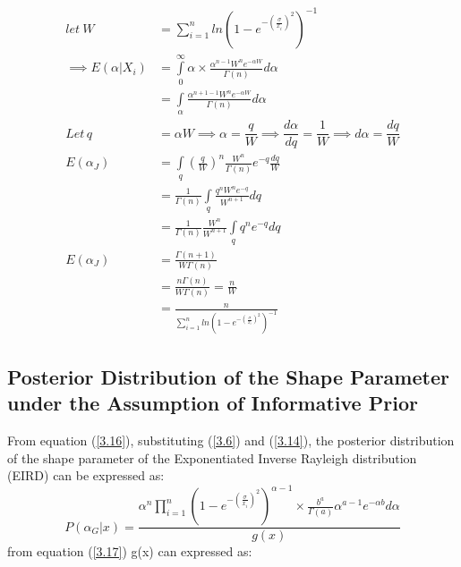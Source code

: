\documentclass[a4paper,12pt]{report}
\begin{document}
\begin{equation}\label{pm1}
\begin{split}
let\ W&=\sum\limits_{ i=1 }^{n}ln\left(1-e^{-\left(\frac{\sigma}{x_i}\right)^2}\right)^{-1}\\
\implies E(\alpha|X_i)&=\int\limits_{0}^{\infty}\alpha \times \frac{\alpha^{n-1}W^n e^{-\alpha W}}{\Gamma(n)} d\alpha\\
&=\int\limits_{\alpha}\frac{\alpha^{n+1-1}W^n e^{-\alpha W}}{\Gamma(n)} d\alpha \\
Let\,q&=\alpha W \implies\alpha=\dfrac{q}{W}\implies\dfrac{d\alpha}{dq}=\dfrac{1}{W}\implies d\alpha=\dfrac{dq}{W}\\
E(\alpha_J)&=\int\limits_{q}\left(\frac{q}{W}\right)^{n}\frac{W^n}{\Gamma(n)}e^{-q}\frac{dq}{W}\\
&=\frac{1}{\Gamma(n)}\int\limits_{q}\frac{q^{n}W^ne^{-q}}{W^{n+1}}dq\\
&=\frac{1}{\Gamma(n)}\frac{W^n}{W^{n+1}}\int\limits_{q}q^{n}e^{-q}dq\\
E(\alpha_J)&=\frac{\Gamma(n+1)}{W\Gamma(n)}\\
&=\frac{n\Gamma(n)}{W\Gamma(n)}=\frac{n}{W}\\
&=\frac{n}{\sum\limits_{ i=1 }^{n}ln\left(1-e^{-\left(\frac{\sigma}{x_i}\right)^2}\right)^{-1}}
\end{split}
\end{equation}

\subsection{Posterior Distribution of the Shape Parameter under the Assumption of Informative Prior}
From equation (\ref{3.16}), substituting (\ref{3.6}) and (\ref{3.14}), the posterior distribution of the shape parameter of the Exponentiated Inverse Rayleigh distribution (EIRD) can be expressed as:
\begin{equation}\label{3.23}
P(\alpha_G|x)=\frac{\alpha^n \prod\limits_{ i=1 }^{n}\left(1-e^{-\left(\frac{\sigma}{x_i}\right)^2}\right)^{\alpha-1}\times \frac{b^a}{\Gamma(a)}\alpha^{a-1}e^{-\alpha b}d\alpha}{g(x)} 
\end{equation} 
from equation (\ref{3.17}) g(x) can expressed as:
\end{document}
